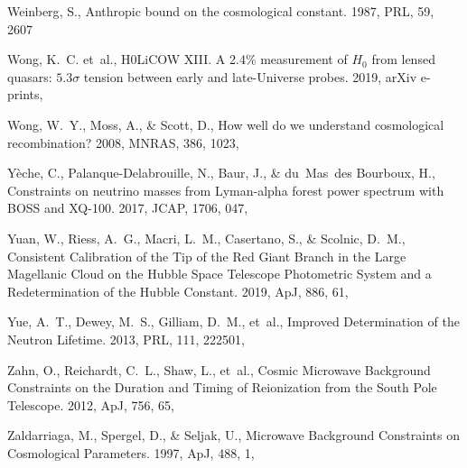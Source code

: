 \documentclass[longauth,traditabstract]{aa}
\def\apj{{ApJ}}
\def\mnras{{MNRAS}}
\def\prl{{PRL}}
\def\jcap{{JCAP}}
\begin{document}
\begin{thebibliography}{379}
{Weinberg}, S., {Anthropic bound on the cosmological constant}. 1987, \prl, 59,
  2607

Wong, K.~C. {et~al.}, {H0LiCOW XIII. A 2.4\% measurement of $H_{0}$ from lensed
  quasars: $5.3\sigma$ tension between early and late-Universe probes}. 2019,
  arXiv e-prints, 

{Wong}, W.~Y., {Moss}, A., \& {Scott}, D., {How well do we understand
  cosmological recombination?} 2008, \mnras, 386, 1023, 

Yèche, C., Palanque-Delabrouille, N., Baur, J., \& du~Mas~des Bourboux, H.,
  {Constraints on neutrino masses from Lyman-alpha forest power spectrum with
  BOSS and XQ-100}. 2017, \jcap, 1706, 047, 

{Yuan}, W., {Riess}, A.~G., {Macri}, L.~M., {Casertano}, S., \& {Scolnic},
  D.~M., {Consistent Calibration of the Tip of the Red Giant Branch in the
  Large Magellanic Cloud on the Hubble Space Telescope Photometric System and a
  Redetermination of the Hubble Constant}. 2019, \apj, 886, 61,

Yue, A.~T., Dewey, M.~S., Gilliam, D.~M., {et~al.}, {Improved Determination of
  the Neutron Lifetime}. 2013, \prl, 111, 222501, 

Zahn, O., Reichardt, C.~L., Shaw, L., {et~al.}, Cosmic Microwave Background
  Constraints on the Duration and Timing of Reionization from the {{South Pole
  Telescope}}. 2012, \apj, 756, 65, 

Zaldarriaga, M., Spergel, D., \& Seljak, U., Microwave {{Background
  Constraints}} on {{Cosmological Parameters}}. 1997, \apj, 488, 1,


\end{thebibliography}
\end{document}
